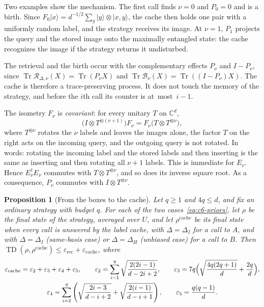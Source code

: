 \documentclass[11pt,letterpaper]{article}
\newtheorem{proposition}[theorem]{Proposition}
\theoremstyle{definition}\newtheorem{definition}[theorem]{Definition}
\newcommand{\C}{\mathbb C}
\newcommand{\Tr}{\operatorname{Tr}}
\newcommand{\TD}{\operatorname{TD}}
\newcommand{\ket}[1]{\lvert#1\rangle}
\begin{document}
Two examples show the mechanism. The first call finds $\nu=0$ and $P_0=0$
and is a birth. Since $F_0\ket x=d^{-1/2}\sum_y\ket y\otimes\ket{x,y}$,
the cache then holds one pair with a uniformly random label, and the
strategy receives its image. At $\nu=1$, $P_1$ projects the query and
the stored image onto the maximally entangled state: the cache
recognizes the image if the strategy returns it undisturbed.

The retrieval and the birth
occur with the complementary effects $P_\nu$ and $I-P_\nu$, since
$\Tr\mathcal R_{\Delta,\nu}(X)=\Tr(P_\nu X)$ and
$\Tr\mathcal B_\nu(X)=\Tr((I-P_\nu)X)$. The cache is therefore a
trace-preserving process. It does not touch the memory of the strategy,
and before the $i$th call its counter is at~most~$i-1$.

The isometry $F_\nu$ is \emph{covariant}: for every unitary $T$ on
$\C^d$,
\begin{equation}\label{eq:covariance}
 \bigl(I\otimes T^{\otimes(\nu+1)}\bigr)F_\nu
 =F_\nu\bigl(T\otimes T^{\otimes\nu}\bigr),
\end{equation}
where $T^{\otimes\nu}$ rotates the $\nu$ labels and leaves the images
alone, the factor $T$ on the right acts on the incoming query, and the
outgoing query is not rotated. In words: rotating the incoming label
and the stored labels and then inserting is the same as inserting and
then rotating all $\nu+1$ labels. This is immediate for $E_\nu$. Hence
$E_\nu^\dagger E_\nu$ commutes with $T\otimes T^{\otimes\nu}$, and so
does its inverse square root. As a consequence, $P_\nu$ commutes with
$I\otimes T^{\otimes\nu}$.

\begin{proposition}[From the boxes to the cache]\label{prop:cache}
Let $q\ge1$ and $4q\le d$, and fix an ordinary strategy with budget
$q$. For each of the two cases~\eqref{eq:c6-priors}, let $\rho$ be the
final state of the strategy, averaged over $U$, and let
$\rho^{\mathrm{cache}}$ be its final state when every call is answered
by the label cache, with $\Delta=\Delta_I$ for a call to $A$, and with
$\Delta=\Delta_I$ (same-basis case) or $\Delta=\Delta_H$ (unbiased
case) for a call to $B$. Then
$\TD(\rho,\rho^{\mathrm{cache}})\le
\varepsilon_{\mathrm{rec}}+\varepsilon_{\mathrm{cache}}$, where
\begin{equation}\label{eq:eps-cache}
\begin{gathered}
 \varepsilon_{\mathrm{cache}}
 =\varepsilon_2+\varepsilon_3+\varepsilon_4+\varepsilon_5,\qquad
 \varepsilon_2=\sum_{i=1}^q\sqrt{\frac{2(2i-1)}{d-2i+2}},\qquad
 \varepsilon_3=7q\Bigl(\sqrt{\frac{4q(2q+1)}d}+\frac{2q}d\Bigr),\\
 \varepsilon_4=\sum_{i=2}^q\left(\sqrt{\frac{2i-3}{d-i+2}}
       +\sqrt{\frac{2(i-1)}{d-i+1}}\right),\qquad
 \varepsilon_5=\frac{q(q-1)}d .
\end{gathered}
\end{equation}
\end{proposition}
\end{document}
